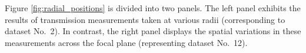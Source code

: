 Figure \ref{fig:radial_positions} is divided into two panels. The left panel exhibits the results of transmission measurements taken at various radii (corresponding to dataset No.~2). In contrast, the right panel displays the spatial variations in these measurements across the focal plane (representing dataset No.~12).

